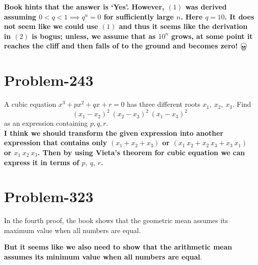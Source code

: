 \documentclass[12pt]{article}
\begin{document}
\textbf{Book hints that the answer is `Yes'. However, $(1)$ was derived assuming $0 < q < 1 \implies q^n = 0$ for sufficiently large $n$. Here $q = 10$. It does not seem like we could use $(1)$ and thus it seems like the derivation in $(2)$ is bogus; unless, we assume that as $10^n$ grows, at some point it reaches the cliff and then falls of to the ground and becomes zero! $\bigskull$}

\section*{Problem-243}
A cubic equation $x^3 + px^2 + qx +r = 0$ has three different roots $x_1,\ x_2,\ x_3$. Find
\[
	(x_1 - x_2)^2\ (x_2 - x_3)^2\ (x_1 - x_3)^2
\]
as an expression containing $p, q, r$.\\

\textbf{I think we should transform the given expression into another expression that contains only $(x_1 + x_2 + x_3)$ or $(x_1\ x_2 + x_2\ x_3 + x_3\ x_1)$ or $x_1\ x_2\ x_3$. Then by using Vieta's theorem for cubic equation we can express it in terms of $p,\ q,\ r$.}

\section*{Problem-323}
In the fourth proof, the book shows that the geometric mean assumes its maximum value when all numbers are equal. 

\textbf{But it seems like we also need to show that the arithmetic mean assumes its minimum value when all numbers are equal}.
\end{document}
